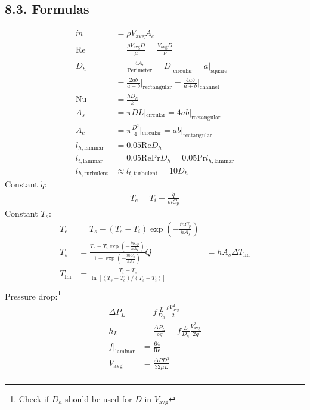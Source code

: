\documentclass[10pt]{article}
\begin{document}
\begin{multicols*}{2}
\subsection*{8.3. Formulas}
\vspace{-0.4cm}
\begin{align*}
    \dot{m} &= \rho V_{\text{avg}} A_c \\
    \text{Re} &= \frac{\rho V_{\text{avg}} D}{\mu}  = \frac{V_{\text{avg}} D}{\nu} \\
    D_h &= \frac{4 A_c}{\text{Perimeter}} = D\rvert_{\text{circular}} = a\rvert_{\text{square}}   \\
    &= \frac{2ab}{a + b} \bigg\rvert_{\text{rectangular}} = \frac{4ab}{a+b}\bigg\rvert_{\text{channel}} \\
    \text{Nu} &= \frac{hD_h}{k} \\ 
    A_s &= \pi D L|_{\text{circular}} = 4ab|_{\text{rectangular}} \\
    A_c &= \pi \frac{D^2}{4}|_{\text{circular}} = ab|_{\text{rectangular}} \\
    l_{h, \text{laminar}} &= 0.05 \text{Re} D_h \\
    l_{t, \text{laminar}} &= 0.05 \text{Re} \text{Pr} D_h = 0.05 \text{Pr} l_{h, \text{laminar}} \\
    l_{h, \text{turbulent}} &\approx l_{t, \text{turbulent}} = 10D_h 
\end{align*}
\vspace{-0.5cm}
Constant $\dot{q}$:
\begin{align*}
    T_e = T_i + \frac{\dot{q}}{\dot{m} C_p} 
\end{align*}
Constant $T_s$:
\begin{align*}
    T_e &= T_s - (T_s - T_i) \exp\left(-\frac{\dot{m} C_p}{h A_s}\right) \\
    T_s &=\frac{T_e - T_i \exp\left(-\frac{\dot{m} C_p}{h A_s}\right)}{1 - \exp\left(-\frac{\dot{m} C_p}{h A_s}\right)}
    \dot{Q} &= h A_s \Delta T_{\text{lm}} \\
    T_{\text{lm}} &= \frac{T_{i} - T_{e}}{\ln[(T_{s} - T_{e})/(T_{s} - T_{i})]} \\
\end{align*}    
Pressure drop:\footnote{Check if $D_h$ should be used for $D$ in $V_{\text{avg}}$}
\begin{align*}
    \Delta P_{L} &= f \frac{L}{D_h} \frac{\rho V_{\text{avg}}^2}{2} \\
    h_L &= \frac {\Delta P_L}{\rho g} = f \frac{L}{D_h} \frac{V_{\text{avg}}^2}{2g} \\
    f|_{\text{laminar}} &= \frac{64}{\text{Re}} \\
    V_{\text{avg}} &= \frac{\Delta P D^2}{32 \mu L} \\
\end{align*} 

\end{multicols*}
\end{document}

